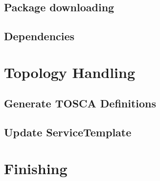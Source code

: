 \fi
\subsection*{Package downloading}

\fi
\subsection*{Dependencies}

\fi
\section{Topology Handling}

\fi
\subsection*{Generate TOSCA Definitions}

\fi
\subsection*{Update ServiceTemplate}


\fi
\section{Finishing}


\fi
